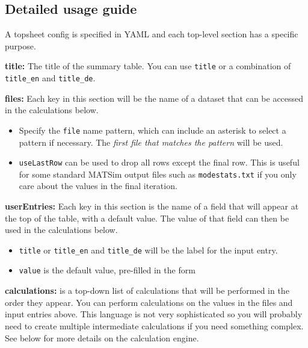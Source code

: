 \begin{Shaded}
\begin{Highlighting}[]
\AttributeTok{  }\KeywordTok{{-}}\AttributeTok{ }\KeywordTok{:}
\AttributeTok{    }\KeywordTok{:}
\AttributeTok{    }\KeywordTok{:}
\end{Highlighting}
\end{Shaded}

\hypertarget{detailed-usage-guide}{%
\subsection{Detailed usage guide}\label{detailed-usage-guide}}

A topsheet config is specified in YAML and each top-level section has a
specific purpose.

\textbf{title:} The title of the summary table. You can use
\texttt{title} or a combination of \texttt{title\_en} and
\texttt{title\_de}.

\textbf{files:} Each key in this section will be the name of a dataset
that can be accessed in the calculations below.

\begin{itemize}
\tightlist
\item
  Specify the \texttt{file} name pattern, which can include an asterisk
  to select a pattern if necessary. The \emph{first file that matches
  the pattern} will be used.
\item
  \texttt{useLastRow} can be used to drop all rows except the final row.
  This is useful for some standard MATSim output files such as
  \texttt{modestats.txt} if you only care about the values in the final
  iteration.
\end{itemize}

\textbf{userEntries:} Each key in this section is the name of a field
that will appear at the top of the table, with a default value. The
value of that field can then be used in the calculations below.

\begin{itemize}
\tightlist
\item
  \texttt{title} or \texttt{title\_en} and \texttt{title\_de} will be
  the label for the input entry.
\item
  \texttt{value} is the default value, pre-filled in the form
\end{itemize}

\textbf{calculations:} is a top-down list of calculations that will be
performed in the order they appear. You can perform calculations on the
values in the files and input entries above. This language is not very
sophisticated so you will probably need to create multiple intermediate
calculations if you need something complex. See below for more details
on the calculation engine.

